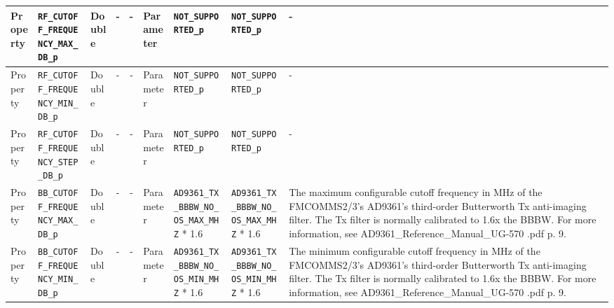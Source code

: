 \begin{landscape}
\begin{scriptsize}
\begin{longtable}{|p{1.8cm}|p{4.1cm}|p{1cm}|c|c|p{1.6cm}|p{3.7cm}|p{3.7cm}|p{2.5cm}|}
			\hline
			Property     & \verb+RF_CUTOFF_FREQUENCY_MAX_DB_p+ & Double & -       & -          & Parameter & \verb+NOT_SUPPORTED_p+ & \verb+NOT_SUPPORTED_p+ & - \\
			\hline
			Property     & \verb+RF_CUTOFF_FREQUENCY_MIN_DB_p+ & Double & -       & -          & Parameter & \verb+NOT_SUPPORTED_p+ & \verb+NOT_SUPPORTED_p+ & - \\
			\hline
			Property     & \verb+RF_CUTOFF_FREQUENCY_STEP_DB_p+ & Double & -       & -          & Parameter & \verb+NOT_SUPPORTED_p+ & \verb+NOT_SUPPORTED_p+ & - \\
			\hline
			Property     & \verb+BB_CUTOFF_FREQUENCY_MAX_DB_p+ & Double & -       & -          & Parameter & \verb+AD9361_TX_BBBW_NO_OS_MAX_MHZ+ * 1.6 & \verb+AD9361_TX_BBBW_NO_OS_MAX_MHZ+ * 1.6 &
The maximum configurable cutoff frequency in MHz of the FMCOMMS2/3's AD9361's third-order Butterworth Tx anti-imaging filter. The Tx filter is normally calibrated to 1.6x the BBBW. For more information, see AD9361\_Reference\_Manual\_UG-570    .pdf p. 9.

			\\
			\hline
			Property     & \verb+BB_CUTOFF_FREQUENCY_MIN_DB_p+ & Double & -       & -          & Parameter & \verb+AD9361_TX_BBBW_NO_OS_MIN_MHZ+ * 1.6 & \verb+AD9361_TX_BBBW_NO_OS_MIN_MHZ+ * 1.6 &
The minimum configurable cutoff frequency in MHz of the FMCOMMS2/3's AD9361's third-order Butterworth Tx anti-imaging filter. The Tx filter is normally calibrated to 1.6x the BBBW. For more information, see AD9361\_Reference\_Manual\_UG-570    .pdf p. 9.


\end{longtable}
\end{scriptsize}
\end{landscape}
